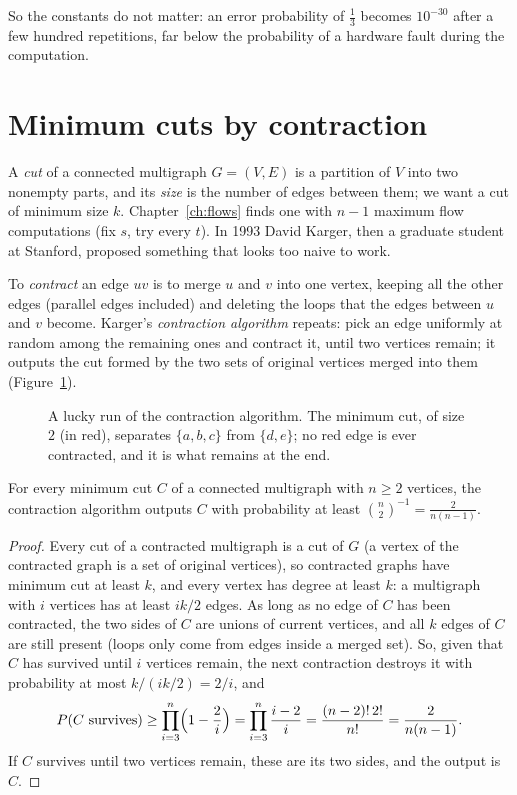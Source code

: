 So the constants do not matter: an error probability of $\tfrac13$ becomes $10^{-30}$ after a few hundred repetitions, far below the probability of a hardware fault during the computation.

\section{Minimum cuts by contraction}\label{sec:karger}

A \emph{cut} of a connected multigraph $G=(V,E)$ is a partition of $V$ into two nonempty parts, and its \emph{size} is the number of edges between them; we want a cut of minimum size $k$. Chapter~\ref{ch:flows}
finds one with $n-1$ maximum flow computations (fix $s$, try every $t$). In 1993 David Karger, then a graduate student at Stanford, proposed something that looks too naive to work.

To \emph{contract} an edge $uv$ is to merge $u$ and $v$ into one vertex, keeping all the other edges (parallel edges included) and deleting the loops that the edges between $u$ and $v$ become. Karger's
\emph{contraction algorithm} repeats: pick an edge uniformly at random among the remaining ones and contract it, until two vertices remain; it outputs the cut formed by the two sets of original vertices
merged into them (Figure~\ref{fig:karger}).

\begin{figure}[ht]
\centering
{}
\caption{A lucky run of the contraction algorithm. The minimum cut, of size $2$ (in red), separates $\{a,b,c\}$ from $\{d,e\}$; no red edge is ever contracted, and it is what remains at the end.}
\label{fig:karger}
\end{figure}

\begin{theorem}[Karger, 1993]\label{thm:karger}
For every minimum cut $C$ of a connected multigraph with $n\ge2$ vertices, the contraction algorithm outputs $C$ with probability at least $\binom n2^{-1}=\frac2{n(n-1)}$.
\end{theorem}
\begin{proof}
Every cut of a contracted multigraph is a cut of $G$ (a vertex of the contracted graph is a set of original vertices), so contracted graphs have minimum cut at least $k$, and every vertex has degree at least $k$: a multigraph with
$i$ vertices has at least $ik/2$ edges. As long as no edge of $C$ has been contracted, the two sides of $C$ are unions of current vertices, and all $k$ edges of $C$ are still present (loops only come from edges inside a merged set). So,
given that $C$ has survived until $i$ vertices remain, the next contraction destroys it with probability at most $k/(ik/2)=2/i$, and
\[
P(C\text{ survives})\ge\prod_{i=3}^n\Bigl(1-\frac2i\Bigr)=\prod_{i=3}^n\frac{i-2}i=\frac{(n-2)!\,2!}{n!}=\frac2{n(n-1)}.
\]
If $C$ survives until two vertices remain, these are its two sides, and the output is $C$.
\end{proof}

